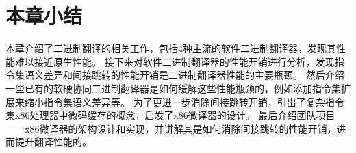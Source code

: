 



\section{本章小结}

本章介绍了二进制翻译的相关工作，包括4种主流的软件二进制翻译器，发现其性能难以接近原生性能。
接下来对软件二进制翻译器的性能开销进行分析，发现指令集语义差异和间接跳转的性能开销是二进制翻译器性能的主要瓶颈。
然后介绍一些已有的软硬协同二进制翻译器是如何缓解这些性能瓶颈的，例如添加指令集扩展来缩小指令集语义差异等。
为了更进一步消除间接跳转开销，引出了复杂指令集x86处理器中微码缓存的概念，启发了x86微译器的设计。
最后介绍团队项目——x86微译器的架构设计和实现，并讲解其是如何消除间接跳转的性能开销，进而提升翻译性能的。

